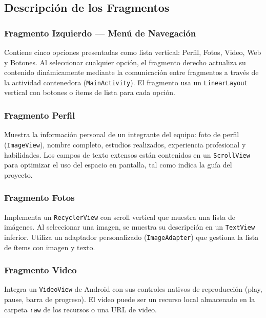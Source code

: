 \documentclass[stu, 12pt, letterpaper, donotrepeattitle, floatsintext, natbib]{apa7}
\begin{document}
\subsection{Descripción de los Fragmentos}

\subsubsection{Fragmento Izquierdo --- Menú de Navegación}

Contiene cinco opciones presentadas como lista vertical: Perfil, Fotos, Video, Web y
Botones. Al seleccionar cualquier opción, el fragmento derecho actualiza su contenido
dinámicamente mediante la comunicación entre fragmentos a través de la actividad
contenedora (\texttt{MainActivity}). El fragmento usa un \texttt{LinearLayout} vertical
con botones o ítems de lista para cada opción.

\subsubsection{Fragmento Perfil}

Muestra la información personal de un integrante del equipo: foto de perfil
(\texttt{ImageView}), nombre completo, estudios realizados, experiencia profesional y
habilidades. Los campos de texto extensos están contenidos en un \texttt{ScrollView}
para optimizar el uso del espacio en pantalla, tal como indica la guía del proyecto.

\subsubsection{Fragmento Fotos}

Implementa un \texttt{RecyclerView} con scroll vertical que muestra una lista de
imágenes. Al seleccionar una imagen, se muestra su descripción en un \texttt{TextView}
inferior. Utiliza un adaptador personalizado (\texttt{ImageAdapter}) que gestiona la
lista de ítems con imagen y texto.

\subsubsection{Fragmento Video}

Integra un \texttt{VideoView} de Android con sus controles nativos de reproducción
(play, pause, barra de progreso). El video puede ser un recurso local almacenado en la
carpeta \texttt{raw} de los recursos o una URL de video.
\end{document}
